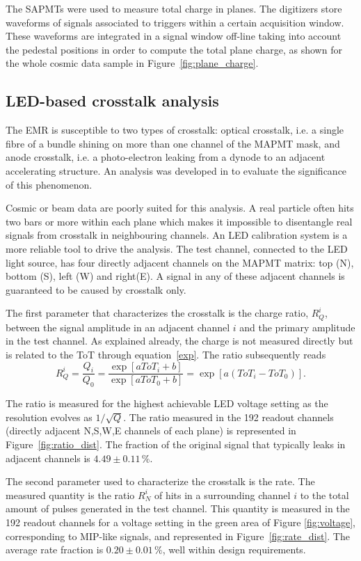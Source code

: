 \documentclass[a4paper,11pt]{article}
\begin{document}
The SAPMTs were used to measure total charge in planes. The digitizers store waveforms of signals associated to triggers within a certain acquisition
window. These waveforms are integrated in a signal window off-line taking into account the pedestal positions in order to compute the total plane
charge, as shown for the whole cosmic data sample in Figure~\ref{fig:plane_charge}.

\subsection{LED-based crosstalk analysis}\label{sec_xt}
The EMR is susceptible to two types of crosstalk: optical crosstalk, i.e. a single fibre of a bundle shining on more than one channel of the MAPMT mask, and anode
crosstalk, i.e. a photo-electron leaking from a dynode to an adjacent accelerating structure. An analysis was developed in \cite{emr_xt, Francois} to evaluate the
significance of this phenomenon.

Cosmic or beam data are poorly suited for this analysis. A real particle often hits two bars or more within each plane which makes it impossible to disentangle
real signals from crosstalk in neighbouring channels. An LED calibration system is a more reliable tool to drive the analysis. The test channel, connected to the LED
light source, has four directly adjacent channels on the MAPMT matrix: top (N), bottom (S), left (W) and right(E). A signal in any of these adjacent channels is guaranteed to be caused
by crosstalk only.

The first parameter that characterizes the crosstalk is the charge ratio, $R_Q^i$, between the signal amplitude in an adjacent channel $i$ and the primary
amplitude in the test channel. As explained already, the charge is not measured directly but is related to the ToT through equation~\ref{exp}. The ratio
subsequently reads
\begin{equation}
R_Q^i=\frac{Q_i}{Q_0}=\frac{\exp[aToT_i+b]}{\exp[aToT_0+b]}=\exp\left[a(ToT_i-ToT_0)\right].
\end{equation}

The ratio is measured for the highest achievable LED voltage setting as the resolution evolves as $1/\sqrt{Q}$. The ratio measured in the 192 readout channels
(directly adjacent N,S,W,E channels of each plane) is represented in Figure~\ref{fig:ratio_dist}. The fraction of the original signal that typically leaks in
adjacent channels is $4.49\pm0.11\,\%$.

The second parameter used to characterize the crosstalk is the rate. The measured quantity is the ratio $R_N^i$ of hits in a surrounding channel $i$ to the
total amount of pulses generated in the test channel. This quantity is measured in the 192 readout channels for a voltage setting in the green area of Figure
\ref{fig:voltage}, corresponding to MIP-like signals, and represented in Figure~\ref{fig:rate_dist}. The average rate fraction is $0.20\pm0.01\,\%$, well within
design requirements.
\end{document}
